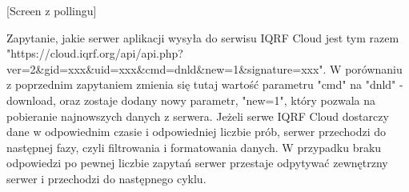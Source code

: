 [Screen z pollingu]

Zapytanie, jakie serwer aplikacji wysyła do serwisu IQRF Cloud jest tym razem 
"https://cloud.iqrf.org/api/api.php?ver=2\&gid=xxx\&uid=xxx\&cmd=dnld\&new=1\&signature=xxx". W porównaniu z poprzednim zapytaniem zmienia się tutaj wartość parametru
"cmd" na "dnld" - download, oraz zostaje dodany nowy parametr, "new=1", który pozwala na pobieranie najnowszych danych z serwera. Jeżeli serwe IQRF Cloud dostarczy dane
w odpowiednim czasie i odpowiedniej liczbie prób, serwer przechodzi do następnej fazy, czyli filtrowania i formatowania danych. W przypadku braku odpowiedzi po
pewnej liczbie zapytań serwer przestaje odpytywać zewnętrzny serwer i przechodzi do następnego cyklu.




